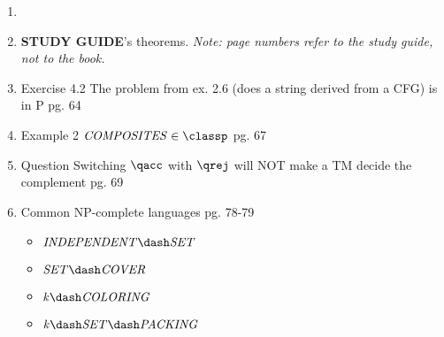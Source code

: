 \documentclass[12pt]{article} %
\newcommand{\theoremitem}[3]{\item #1 \quad #2 \dotfill #3}
\newenvironment{theoremlist} {
    \begin{enumerate}[nosep,leftmargin=*,label={}]
} {
    \end{enumerate}
}
\begin{document}
\begin{theoremlist}
    \item[]
    \item[]
    \textbf{STUDY GUIDE}'s theorems. \textit{Note: page numbers refer to the study guide, not to the book.}
    \theoremitem{Exercise 4.2}
    {The problem from ex. 2.6 (does a string derived from a CFG) is in P}
    {pg. 64}
    \theoremitem{Example 2}
    {$\mathit{COMPOSITES}\in\classp$}
    {pg. 67}
    \theoremitem{Question}
    {Switching $\qacc$ with $\qrej$ will NOT make a TM decide the complement}
    {pg. 69}
    
    \theoremitem{Common NP-complete languages}
    {}
    {pg. 78-79}
    \begin{multicols}{2}
    \begin{itemize}[nosep]
        \item $\mathit{INDEPENDENT\dash SET}$
        \item $\mathit{SET\dash COVER}$
        \item $\mathit{k\dash COLORING}$
        \item $\mathit{k\dash SET\dash PACKING}$
    \end{itemize}
    \end{multicols}
\end{theoremlist}
\end{document}
